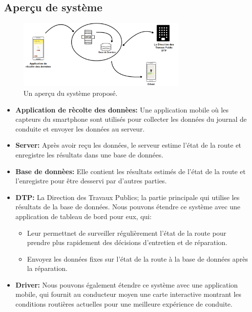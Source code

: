 \subsection{Aperçu de système}
\begin{figure}[h!]
    \center
    \includegraphics[width=0.75\textwidth]{Images/chapter3/systemOverview.png}
    \caption{Un aperçu du système proposé.}
    \label{fig:System}
\end{figure}

\begin{itemize}
    \item \textbf{Application de rècolte des donnèes:} Une application mobile où les capteurs du smartphone sont utilisés pour collecter les données du journal de conduite et envoyer les données au serveur.
    \item  \textbf{Server:} Après avoir reçu les données, le serveur estime l'état de la route et enregistre les résultats dans une base de données.
    \item \textbf{Base de donnèes:} Elle contient les résultats estimés de l'état de la route et l'enregistre pour être desservi par d'autres parties.
    \item  \textbf{DTP:} La Direction des Travaux Publics; la partie principale qui utilise les résultats de la base de données. Nous pouvons étendre ce système avec une application de tableau de bord pour eux, qui: \begin{itemize}
              \item Leur permettnet de surveiller régulièrement l'état de la route pour prendre plus rapidement des décisions d'entretien et de réparation.
              \item Envoyez les données fixes sur l'état de la route à la base de données après la réparation.
          \end{itemize}
    \item \textbf{Driver:} Nous pouvons également étendre ce système avec une application mobile, qui fournit au conducteur moyen une carte interactive montrant les conditions routières actuelles pour une meilleure expérience de conduite.
\end{itemize}

